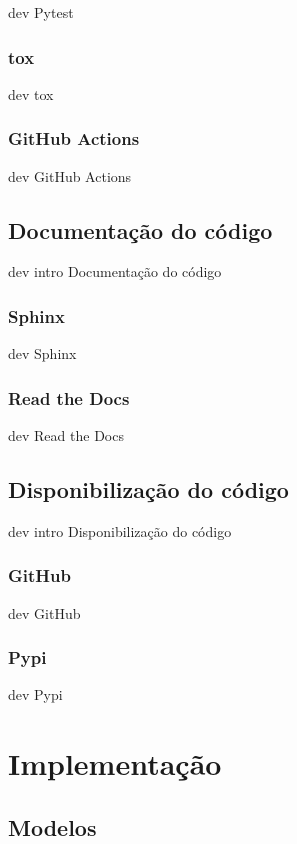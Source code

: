 dev Pytest

\subsubsection{tox}

dev tox

\subsubsection{GitHub Actions}

dev GitHub Actions

\subsection{Documentação do código}

dev intro Documentação do código

\subsubsection{Sphinx}

dev Sphinx

\subsubsection{Read the Docs}

dev Read the Docs

\subsection{Disponibilização do código}

dev intro Disponibilização do código

\subsubsection{GitHub}

dev GitHub

\subsubsection{Pypi}

dev Pypi

\section{Implementação}

\subsection{Modelos}


